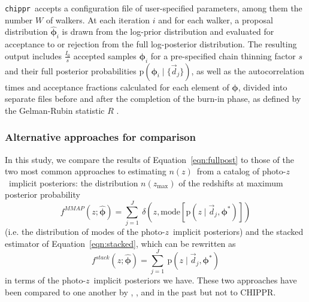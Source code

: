 \documentclass[iop]{emulateapj}
\newcommand{\Sect}[1]{Section~\ref{#1}}
\newcommand{\Eq}[1]{Equation~\ref{#1}}
\newcommand{\project}[1]{\textsc{#1}}
\newcommand{\Chippr}{\project{CHIPPR}}
\newcommand{\repo}[1]{\texttt{#1}}
\newcommand{\chippr}{\repo{chippr}}
\newcommand{\data}{\ensuremath{\vec{d}}}
\newcommand{\pr}[1]{\ensuremath{\mathrm{p}(#1)}}
\newcommand{\gvn}{\mid}
\newcommand{\pz}{photo-$z$}
\newcommand{\pzip}{\pz\ implicit posterior}
\newcommand{\nz}{$n(z)$}
\newcommand{\bvec}[1]{\ensuremath{\boldsymbol{#1}}}
\newcommand{\ndphi}{\bvec{\phi}}
\begin{document}
\chippr\ accepts a configuration file of user-specified parameters, among them the number $W$ of walkers.
At each iteration $i$ and for each walker, a proposal distribution $\hat{\ndphi}_{i}$ is drawn from the log-prior distribution and evaluated for acceptance to or rejection from the full log-posterior distribution.
The resulting output includes $\frac{I_{0}}{s}$ accepted samples $\ndphi_{i}$ for a pre-specified chain thinning factor $s$ and their full posterior probabilities $\pr{\ndphi_{i} \gvn \{\data_{j}\}}$, as well as the autocorrelation times and acceptance fractions calculated for each element of $\ndphi$, divided into separate files before and after the completion of the burn-in phase, as defined by the Gelman-Rubin statistic $R$ \citep{gelman_inference_1992}.

\subsubsection{Alternative approaches for comparison}
\label{sec:sheldon}

In this study, we compare the results of \Eq{eqn:fullpost} to those of the two most common approaches to estimating \nz\ from a catalog of \pzip s: 
the distribution $n(z_{\mathrm{max}})$ of the redshifts at maximum posterior probability
\begin{equation}
\label{eqn:mmap}
f^{MMAP}(z; \hat{\ndphi}) = \sum_{j=1}^{J}\ \delta(z, \mathrm{mode}[\pr{z \gvn \data_{j}, \ndphi^{*}}])
\end{equation}
(i.e. the distribution of modes of the \pzip s) and the stacked estimator of \Eq{eqn:stacked}, which can be rewritten as 
\begin{equation}
\label{eqn:stacked}
f^{stack}(z; \hat{\ndphi}) = \sum_{j=1}^{J}\ \pr{z \gvn \data_{j}, \ndphi^{*}}
\end{equation}
in terms of the \pzip s we have.
These two approaches have been compared to one another by \citet{hildebrandt_cfhtlens:_2012}, \citet{benjamin_cfhtlens_2013}, and \citet{asorey_galaxy_2016} in the past but not to \Chippr.
\end{document}
